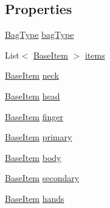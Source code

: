 \subsection*{Properties}
\begin{DoxyCompactItemize}
\item 
\mbox{\hyperlink{class_bag_a5a827c44705d57202edc93b9a39316c7}{Bag\+Type}} \mbox{\hyperlink{class_bag_a84ac63a7f36a20bc22ab8c2de86babcc}{bag\+Type}}
\item 
List$<$ \mbox{\hyperlink{class_base_item}{Base\+Item}} $>$ \mbox{\hyperlink{class_bag_a06d313b5ecfa35740d11e1613d1a7695}{items}}
\item 
\mbox{\hyperlink{class_base_item}{Base\+Item}} \mbox{\hyperlink{class_bag_a6796ecd4f3c30c4514d45cce11b1907c}{neck}}
\item 
\mbox{\hyperlink{class_base_item}{Base\+Item}} \mbox{\hyperlink{class_bag_aad83c56a14d611f6e1d2fac81903d66c}{head}}
\item 
\mbox{\hyperlink{class_base_item}{Base\+Item}} \mbox{\hyperlink{class_bag_a0517877fdabd6917389995deecabe057}{finger}}
\item 
\mbox{\hyperlink{class_base_item}{Base\+Item}} \mbox{\hyperlink{class_bag_af0d1113dd35f217846e53dd477071db1}{primary}}
\item 
\mbox{\hyperlink{class_base_item}{Base\+Item}} \mbox{\hyperlink{class_bag_a1c9c49018ee2e88c1fd09df3bd6d9d9f}{body}}
\item 
\mbox{\hyperlink{class_base_item}{Base\+Item}} \mbox{\hyperlink{class_bag_ad5d314d6b9a11127a8bdebc98f2a9cc0}{secondary}}
\item 
\mbox{\hyperlink{class_base_item}{Base\+Item}} \mbox{\hyperlink{class_bag_a19700ba62882ea2e03f954a6b4f267fa}{hands}}
\item 

\end{DoxyCompactItemize}
